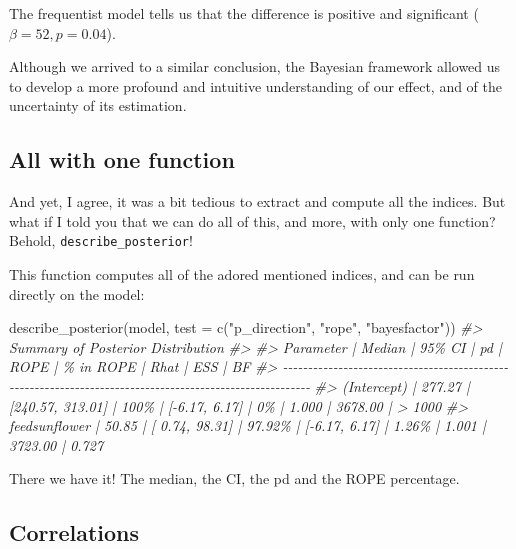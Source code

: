 \documentclass[10pt,a4paper,onecolumn]{article}
\newenvironment{Shaded}{\begin{snugshade}}{\end{snugshade}}
\newcommand{\AttributeTok}[1]{\textcolor[rgb]{0.77,0.63,0.00}{#1}}
\newcommand{\CommentTok}[1]{\textcolor[rgb]{0.56,0.35,0.01}{\textit{#1}}}
\newcommand{\FunctionTok}[1]{\textcolor[rgb]{0.00,0.00,0.00}{#1}}
\newcommand{\NormalTok}[1]{#1}
\newcommand{\StringTok}[1]{\textcolor[rgb]{0.31,0.60,0.02}{#1}}
\begin{document}
The frequentist model tells us that the difference is positive and
significant (\(\beta = 52, p = 0.04\)).

Although we arrived to a similar conclusion, the Bayesian framework
allowed us to develop a more profound and intuitive understanding of our
effect, and of the uncertainty of its estimation.

\hypertarget{all-with-one-function}{%
\subsection{All with one function}\label{all-with-one-function}}

And yet, I agree, it was a bit tedious to extract and compute all the
indices. But what if I told you that we can do all of this, and more,
with only one function? Behold, \texttt{describe\_posterior}!

This function computes all of the adored mentioned indices, and can be
run directly on the model:

\begin{Shaded}
\begin{Highlighting}[]
\FunctionTok{describe\_posterior}\NormalTok{(model, }\AttributeTok{test =} \FunctionTok{c}\NormalTok{(}\StringTok{"p\_direction"}\NormalTok{, }\StringTok{"rope"}\NormalTok{, }\StringTok{"bayesfactor"}\NormalTok{))}
\CommentTok{\#\textgreater{} Summary of Posterior Distribution}
\CommentTok{\#\textgreater{} }
\CommentTok{\#\textgreater{} Parameter     | Median |           95\% CI |     pd |          ROPE | \% in ROPE |  Rhat |     ESS |     BF}
\CommentTok{\#\textgreater{} {-}{-}{-}{-}{-}{-}{-}{-}{-}{-}{-}{-}{-}{-}{-}{-}{-}{-}{-}{-}{-}{-}{-}{-}{-}{-}{-}{-}{-}{-}{-}{-}{-}{-}{-}{-}{-}{-}{-}{-}{-}{-}{-}{-}{-}{-}{-}{-}{-}{-}{-}{-}{-}{-}{-}{-}{-}{-}{-}{-}{-}{-}{-}{-}{-}{-}{-}{-}{-}{-}{-}{-}{-}{-}{-}{-}{-}{-}{-}{-}{-}{-}{-}{-}{-}{-}{-}{-}{-}{-}{-}{-}{-}{-}{-}{-}{-}{-}{-}{-}{-}{-}{-}{-}{-}}
\CommentTok{\#\textgreater{} (Intercept)   | 277.27 | [240.57, 313.01] |   100\% | [{-}6.17, 6.17] |        0\% | 1.000 | 3678.00 | \textgreater{} 1000}
\CommentTok{\#\textgreater{} feedsunflower |  50.85 | [  0.74,  98.31] | 97.92\% | [{-}6.17, 6.17] |     1.26\% | 1.001 | 3723.00 |  0.727}
\end{Highlighting}
\end{Shaded}

There we have it! The median, the CI, the pd and the ROPE percentage.

\hypertarget{correlations}{%
\subsection{Correlations}\label{correlations}}
\end{document}
